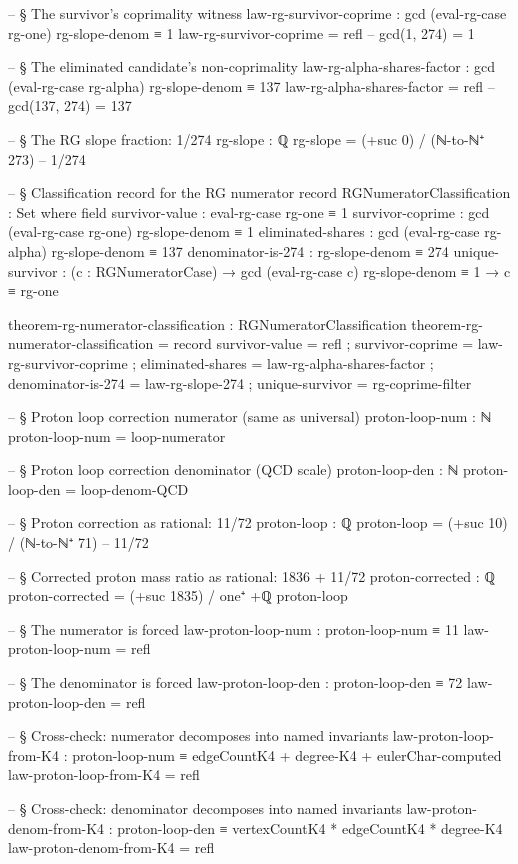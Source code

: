 \documentclass[11pt,a4paper]{book}
\begin{document}
\begin{code}
-- § The survivor's coprimality witness
law-rg-survivor-coprime : gcd (eval-rg-case rg-one) rg-slope-denom ≡ 1
law-rg-survivor-coprime = refl   -- gcd(1, 274) = 1

-- § The eliminated candidate's non-coprimality
law-rg-alpha-shares-factor : gcd (eval-rg-case rg-alpha) rg-slope-denom ≡ 137
law-rg-alpha-shares-factor = refl   -- gcd(137, 274) = 137

-- § The RG slope fraction: 1/274
rg-slope : ℚ
rg-slope = (+suc 0) / (ℕ-to-ℕ⁺ 273)    -- 1/274

-- § Classification record for the RG numerator
record RGNumeratorClassification : Set where
  field
    survivor-value     : eval-rg-case rg-one ≡ 1
    survivor-coprime   : gcd (eval-rg-case rg-one) rg-slope-denom ≡ 1
    eliminated-shares  : gcd (eval-rg-case rg-alpha) rg-slope-denom ≡ 137
    denominator-is-274 : rg-slope-denom ≡ 274
    unique-survivor    :
      (c : RGNumeratorCase) →
      gcd (eval-rg-case c) rg-slope-denom ≡ 1 →
      c ≡ rg-one

theorem-rg-numerator-classification : RGNumeratorClassification
theorem-rg-numerator-classification = record
  { survivor-value     = refl
  ; survivor-coprime   = law-rg-survivor-coprime
  ; eliminated-shares  = law-rg-alpha-shares-factor
  ; denominator-is-274 = law-rg-slope-274
  ; unique-survivor    = rg-coprime-filter
  }

-- § Proton loop correction numerator (same as universal)
proton-loop-num : ℕ
proton-loop-num = loop-numerator

-- § Proton loop correction denominator (QCD scale)
proton-loop-den : ℕ
proton-loop-den = loop-denom-QCD

-- § Proton correction as rational: 11/72
proton-loop : ℚ
proton-loop = (+suc 10) / (ℕ-to-ℕ⁺ 71)     -- 11/72

-- § Corrected proton mass ratio as rational: 1836 + 11/72
proton-corrected : ℚ
proton-corrected = (+suc 1835) / one⁺ +ℚ proton-loop

-- § The numerator is forced
law-proton-loop-num : proton-loop-num ≡ 11
law-proton-loop-num = refl

-- § The denominator is forced
law-proton-loop-den : proton-loop-den ≡ 72
law-proton-loop-den = refl

-- § Cross-check: numerator decomposes into named invariants
law-proton-loop-from-K4 :
  proton-loop-num ≡ edgeCountK4 + degree-K4 + eulerChar-computed
law-proton-loop-from-K4 = refl

-- § Cross-check: denominator decomposes into named invariants
law-proton-denom-from-K4 :
  proton-loop-den ≡ vertexCountK4 * edgeCountK4 * degree-K4
law-proton-denom-from-K4 = refl


\end{code}
\end{document}
